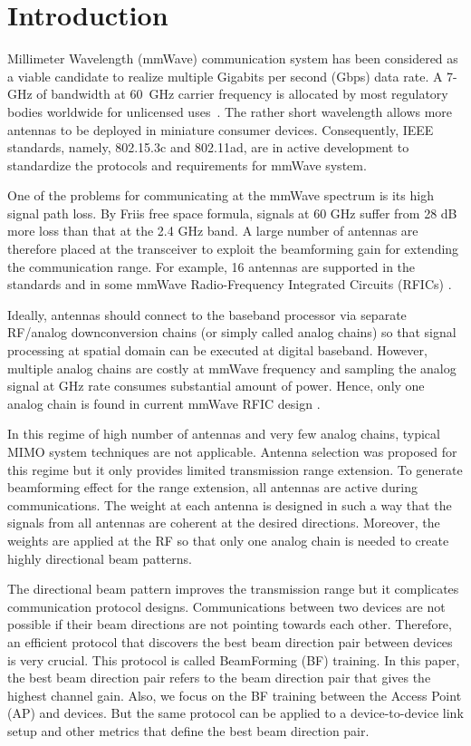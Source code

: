 \documentclass[10pt,conference]{IEEEtran}
\begin{document}
\IEEEpeerreviewmaketitle



\section{Introduction}
Millimeter Wavelength (mmWave) communication system has been
considered as a viable candidate to realize multiple Gigabits per second (Gbps)
data rate. A 7-GHz
of bandwidth at 60~GHz carrier frequency is allocated by
most regulatory bodies worldwide for unlicensed
uses~\cite{yong07}. The rather short wavelength allows more antennas to be
deployed in miniature consumer devices. Consequently, IEEE standards, namely, 802.15.3c\cite{IEEE802153c} and 802.11ad\cite{IEEE80211ad}, are in active development to standardize the protocols and requirements for mmWave system.

One of the problems for communicating at the mmWave spectrum is its
high signal path loss. By Friis free space formula, signals at 60 GHz suffer from 28 dB
more loss than that at the 2.4 GHz band. A large number of antennas
are therefore placed at the transceiver to exploit the beamforming gain for extending the communication range.
For example, 16 antennas are supported in the
standards and in some mmWave Radio-Frequency Integrated Circuits (RFICs) \cite{garcia10}\cite{emanuel10}.

Ideally, antennas should connect to the baseband processor via separate RF/analog downconversion chains (or simply called analog chains) so that signal processing at spatial domain can be executed at digital
baseband. However, multiple analog chains are costly at mmWave frequency and sampling the analog signal at GHz
rate consumes substantial amount of power. Hence, only one analog chain is found in current mmWave RFIC design \cite{garcia10}\cite{emanuel10}.

In this regime of high number of antennas and very few analog chains, typical MIMO system techniques are not applicable. Antenna selection \cite{molisch04} was proposed for this regime but it only provides limited transmission range extension. To generate beamforming effect for the range extension, all antennas are active during
communications. The weight at each antenna is designed in such a way that the signals from all antennas are coherent at the desired directions. Moreover, the weights are applied at the RF \cite{garcia10} so that only one analog chain is needed to create highly directional beam patterns.

The directional beam pattern improves the transmission range but it complicates communication protocol designs. Communications between two devices are not possible if their beam directions are not pointing towards each other. Therefore, an efficient protocol that discovers the best beam direction pair between devices is very crucial. This protocol is called BeamForming (BF) training. In this paper, the best beam direction pair refers to the beam direction pair that gives the highest channel gain. Also, we focus on the BF training between the Access Point (AP) and devices. But the same protocol can be applied to a device-to-device link setup and other metrics that define the best beam direction pair.
\end{document}
